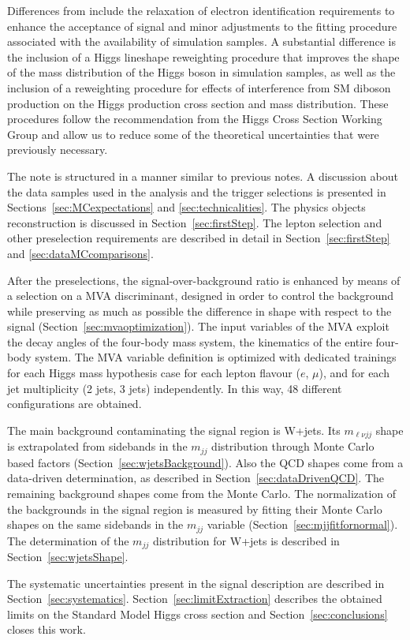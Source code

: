 Differences from \cite{HIG-12-021} include the relaxation of electron
identification requirements to enhance the acceptance of signal and
minor adjustments to the fitting procedure associated with the
availability of simulation samples. A substantial difference is the
inclusion of a Higgs lineshape reweighting procedure that improves the
shape of the mass distribution of the Higgs boson in simulation
samples, as well as the inclusion of a reweighting procedure for
effects of interference from SM diboson production on the Higgs
production cross section and mass distribution. These procedures
follow the recommendation from the Higgs Cross Section Working Group
\cite{Dittmaier:2012vm} and allow us to reduce some of the theoretical
uncertainties that were previously necessary.

The note is structured in a manner similar to previous notes.  A
discussion about the data samples used in the analysis and the trigger
selections is presented in Sections~\ref{sec:MCexpectations} and
\ref{sec:technicalities}.  The physics objects reconstruction is
discussed in Section~\ref{sec:firstStep}.  The lepton selection and
other preselection requirements are described in detail in
Section~\ref{sec:firstStep} and \ref{sec:dataMCcomparisons}.

After the preselections, the signal-over-background ratio is enhanced
by means of a selection on a MVA discriminant, designed in order to
control the background while preserving as much as possible the
difference in shape with respect to the signal
(Section~\ref{sec:mvaoptimization}).  The input variables of the MVA
exploit the decay angles of the four-body mass system, the kinematics
of the entire four-body system. The MVA variable definition is
optimized with dedicated trainings for each Higgs mass hypothesis case
for each lepton flavour ($e$, $\mu$), and for each jet multiplicity (2
jets, 3 jets) independently.  In this way, 48 different configurations
are obtained.

The main background contaminating the signal region is W+jets.  Its
$m_{\ell{}\nu{}jj}$ shape is extrapolated from sidebands in the
$m_{jj}$ distribution through Monte Carlo based factors
(Section~\ref{sec:wjetsBackground}).  Also the QCD shapes come from a
data-driven determination, as described in
Section~\ref{sec:dataDrivenQCD}.  The remaining background shapes come
from the Monte Carlo.  The normalization of the backgrounds in the
signal region is measured by fitting their Monte Carlo shapes on the
same sidebands in the $m_{jj}$ variable
(Section~\ref{sec:mjjfitfornormal}).  The determination of the
$m_{jj}$ distribution for W+jets is described in
Section~\ref{sec:wjetsShape}.

The systematic uncertainties present in the signal description are
described in Section~\ref{sec:systematics}.
Section~\ref{sec:limitExtraction} describes the obtained limits on the
Standard Model Higgs cross section and Section~\ref{sec:conclusions}
closes this work.


